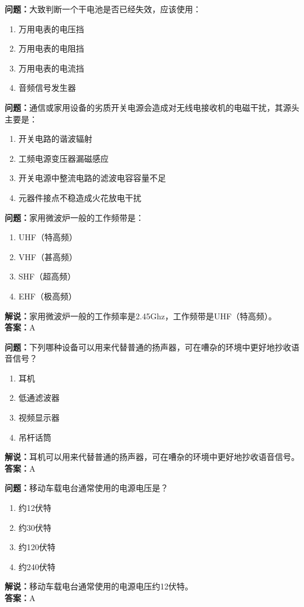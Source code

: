 \documentclass{ctexbook}%
\begin{document}
\textbf{问题：}大致判断一个干电池是否已经失效，应该使用：
\begin{enumerate}[label=\Alph*), leftmargin=3em]
\item 万用电表的电压挡
\item 万用电表的电阻挡
\item 万用电表的电流挡
\item 音频信号发生器
\end{enumerate}

\textbf{问题：}通信或家用设备的劣质开关电源会造成对无线电接收机的电磁干扰，其源头主要是：
\begin{enumerate}[label=\Alph*), leftmargin=3em]
\item 开关电路的谐波辐射
\item 工频电源变压器漏磁感应
\item 开关电源中整流电路的滤波电容容量不足
\item 元器件接点不稳造成火花放电干扰
\end{enumerate}

\textbf{问题：}家用微波炉一般的工作频带是：
\begin{enumerate}[label=\Alph*), leftmargin=3em]
\item UHF（特高频）
\item VHF（甚高频）
\item SHF（超高频）
\item EHF（极高频）
\end{enumerate}
\textbf{解说：}家用微波炉一般的工作频率是2.45Ghz，工作频带是UHF（特高频）。\\
\textbf{答案：}A

\textbf{问题：}下列哪种设备可以用来代替普通的扬声器，可在嘈杂的环境中更好地抄收语音信号？
\begin{enumerate}[label=\Alph*), leftmargin=3em]
\item 耳机
\item 低通滤波器
\item 视频显示器
\item 吊杆话筒
\end{enumerate}
\textbf{解说：}耳机可以用来代替普通的扬声器，可在嘈杂的环境中更好地抄收语音信号。\\
\textbf{答案：}A

\textbf{问题：}移动车载电台通常使用的电源电压是？
\begin{enumerate}[label=\Alph*), leftmargin=3em]
\item 约12伏特
\item 约30伏特
\item 约120伏特
\item 约240伏特
\end{enumerate}
\textbf{解说：}移动车载电台通常使用的电源电压约12伏特。\\
\textbf{答案：}A
\end{document}
